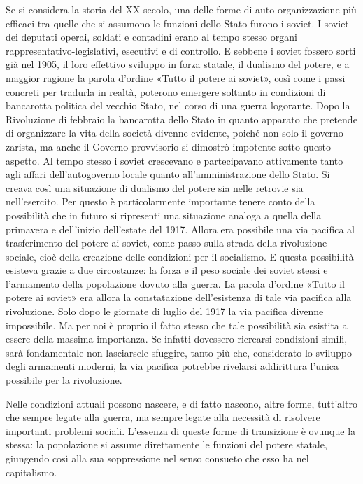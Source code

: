 \documentclass[../main]{subfiles}
\begin{document}
Se si considera la storia del XX secolo, una delle forme di auto-organizzazione più efficaci tra quelle che si assumono le funzioni dello Stato furono i soviet. I soviet dei deputati operai, soldati e contadini erano al tempo stesso organi rappresentativo-legislativi, esecutivi e di controllo. E sebbene i soviet fossero sorti già nel 1905, il loro effettivo sviluppo in forza statale, il dualismo del potere, e a maggior ragione la parola d'ordine «Tutto il potere ai soviet», così come i passi concreti per tradurla in realtà, poterono emergere soltanto in condizioni di bancarotta politica del vecchio Stato, nel corso di una guerra logorante. Dopo la Rivoluzione di febbraio la bancarotta dello Stato in quanto apparato che pretende di organizzare la vita della società divenne evidente, poiché non solo il governo zarista, ma anche il Governo provvisorio si dimostrò impotente sotto questo aspetto. Al tempo stesso i soviet crescevano e partecipavano attivamente tanto agli affari dell'autogoverno locale quanto all'amministrazione dello Stato. Si creava così una situazione di dualismo del potere sia nelle retrovie sia nell'esercito. Per questo è particolarmente importante tenere conto della possibilità che in futuro si ripresenti una situazione analoga a quella della primavera e dell'inizio dell'estate del 1917. Allora era possibile una via pacifica al trasferimento del potere ai soviet, come passo sulla strada della rivoluzione sociale, cioè della creazione delle condizioni per il socialismo. E questa possibilità esisteva grazie a due circostanze: la forza e il peso sociale dei soviet stessi e l'armamento della popolazione dovuto alla guerra. La parola d'ordine «Tutto il potere ai soviet» era allora la constatazione dell'esistenza di tale via pacifica alla rivoluzione. Solo dopo le giornate di luglio del 1917 la via pacifica divenne impossibile. Ma per noi è proprio il fatto stesso che tale possibilità sia esistita a essere della massima importanza. Se infatti dovessero ricrearsi condizioni simili, sarà fondamentale non lasciarsele sfuggire, tanto più che, considerato lo sviluppo degli armamenti moderni, la via pacifica potrebbe rivelarsi addirittura l'unica possibile per la rivoluzione.

Nelle condizioni attuali possono nascere, e di fatto nascono, altre forme, tutt'altro che sempre legate alla guerra, ma sempre legate alla necessità di risolvere importanti problemi sociali. L'essenza di queste forme di transizione è ovunque la stessa: la popolazione si assume direttamente le funzioni del potere statale, giungendo così alla sua soppressione nel senso consueto che esso ha nel capitalismo.
\end{document}

